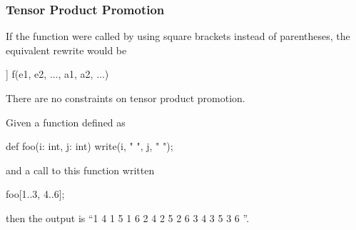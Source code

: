 \subsubsection{Tensor Product Promotion}
\label{Tensor_Product_Promotion}

If the function  were called by using square brackets instead
of parentheses, the equivalent rewrite would be
\begin{chapel}
[(e1, e2, ...) in [s1, s2, ...]] f(e1, e2, ..., a1, a2, ...)
\end{chapel}
There are no constraints on tensor product promotion.

\begin{example}
Given a function defined as
\begin{chapel}
def foo(i: int, j: int) {
  write(i, " ", j, " ");
}
\end{chapel}
and a call to this function written
\begin{chapel}
foo[1..3, 4..6];
\end{chapel}
then the output is ``1 4 1 5 1 6 2 4 2 5 2 6 3 4 3 5 3 6 ''.
\end{example}
